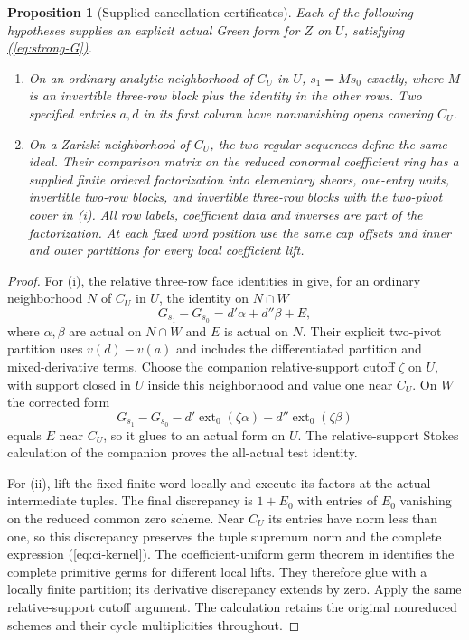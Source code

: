 \documentclass[11pt,a4paper]{article}
\newtheorem{proposition}[theorem]{Proposition}
\theoremstyle{definition}
\theoremstyle{remark}\newtheorem{remark}[theorem]{Remark}
\numberwithin{equation}{section}
\renewcommand{\eqref}[1]{\hyperref[#1]{\textcolor{equationlink}{(\ref*{#1})}}}
\begin{document}
\begin{proposition}[Supplied cancellation certificates]\label{prop:ci-cancellation}
Each of the following hypotheses supplies an explicit actual
Green form for $Z$ on $U$, satisfying \eqref{eq:strong-G}.
\begin{enumerate}[label=\textup{(\roman*)}]
\item On an ordinary analytic neighborhood of $C_U$ in $U$,
$s_1=Ms_0$ exactly, where $M$ is an invertible three-row block
plus the identity in the other rows. Two specified entries $a,d$
in its first column have nonvanishing opens covering $C_U$.
\item On a Zariski neighborhood of $C_U$, the two regular
sequences define the same ideal. Their comparison matrix on the
reduced conormal coefficient ring has a supplied finite ordered
factorization into elementary shears, one-entry units, invertible
two-row blocks, and invertible three-row blocks with the two-pivot
cover in \textup{(i)}. All row labels, coefficient data and inverses
are part of the factorization. At each fixed word position use
the same cap offsets and inner and outer partitions for every
local coefficient lift.
\end{enumerate}
\end{proposition}

\begin{proof}
For (i), the relative three-row face identities in
\cite{InternalTropical} give, for an ordinary neighborhood $N$
of $C_U$ in $U$, the identity on $N\cap W$
\[
 G_{s_1}-G_{s_0}=d'\alpha+d''\beta+E,
\]
where $\alpha,\beta$ are actual on $N\cap W$ and $E$ is
actual on $N$. Their explicit
two-pivot partition uses $v(d)-v(a)$ and includes the differentiated
partition and mixed-derivative terms. Choose the companion
relative-support cutoff $\zeta$ on $U$, with support closed in
$U$ inside this neighborhood and value one near $C_U$.
On $W$ the corrected form
\[
 G_{s_1}-G_{s_0}
 -d'\operatorname{ext}_0(\zeta\alpha)
 -d''\operatorname{ext}_0(\zeta\beta)
\]
equals $E$ near $C_U$, so it glues to an actual form on $U$.
The relative-support Stokes calculation of the companion proves
the all-actual test identity.

For (ii), lift the fixed finite word locally and execute its
factors at the actual intermediate tuples. The final discrepancy
is $1+E_0$ with entries of $E_0$ vanishing on the reduced common
zero scheme. Near $C_U$ its entries have norm less than one, so
this discrepancy preserves the tuple supremum norm and the
complete expression \eqref{eq:ci-kernel}. The coefficient-uniform
germ theorem in \cite{InternalTropical} identifies the complete
primitive germs for different local lifts. They therefore glue
with a locally finite partition; its derivative discrepancy
extends by zero. Apply the same relative-support cutoff argument.
The calculation retains the original nonreduced schemes and their
cycle multiplicities throughout.
\end{proof}
\end{document}
